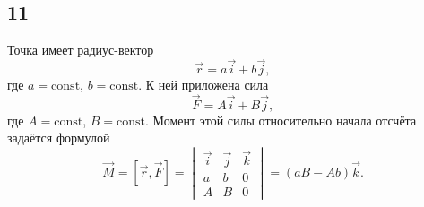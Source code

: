 \subsection{11}

Точка имеет радиус-вектор
\[
\vec r=a\vec i+b\vec j,
\]
где $a=\text{const}$, $b=\text{const}$. К ней приложена сила
\[
\vec F=A\vec i+B\vec j,
\]
где $A=\text{const}$, $B=\text{const}$. Момент этой силы относительно начала отсчёта задаётся формулой
\[
\vec M=[\vec r,\vec F]=
\begin{vmatrix}
	\vec i & \vec j & \vec k \\
	a & b & 0 \\
	A & B & 0
\end{vmatrix}
=(aB-Ab)\vec k.
\]